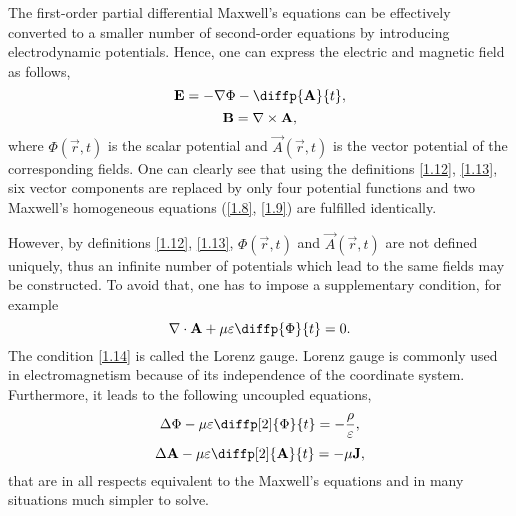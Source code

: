 The first-order partial differential Maxwell's equations can be effectively converted to a smaller number of second-order equations by introducing electrodynamic potentials. Hence, one can express the electric and magnetic field as follows,
\begin{equation}
\label{1.12}
\vec{E} = -\grad{\Phi} - \diffp{\vec{A}}{t},
\end{equation}
\begin{equation}
\label{1.13}
\mathbf{B} = \nabla \times \mathbf{A},
\end{equation}
where $ \Phi\left(\vec{r}, t \right) $ is the scalar potential and $ \vec{A}\left(\vec{r}, t \right) $ is the vector potential of the corresponding fields. One can clearly see that using the definitions \ref{1.12}, \ref{1.13}, six vector components are replaced by only four potential functions and two Maxwell's homogeneous equations (\ref{1.8}, \ref{1.9}) are fulfilled identically. 

However, by definitions \ref{1.12}, \ref{1.13}, $ \Phi\left(\vec{r}, t \right) $ and $ \vec{A}\left(\vec{r}, t \right) $ are not defined uniquely, thus an infinite number of potentials which lead to the same fields may be constructed. To avoid that, one has to impose a supplementary condition, for example
\begin{equation}
\label{1.14}
\div{\vec{A}} + \mu \varepsilon \diffp{\Phi}{t} = 0.
\end{equation}
The condition \ref{1.14} is called the Lorenz gauge. Lorenz gauge is commonly used in electromagnetism because of its independence of the coordinate system. Furthermore, it leads to the following uncoupled equations,
\begin{equation}
\label{1.15}
\laplace{\Phi} - \mu \varepsilon \diffp[2]{\Phi}{t} = -\frac{\rho}{\varepsilon},
\end{equation}
\begin{equation}
\label{1.16}
\laplace{\vec{A}} - \mu \varepsilon \diffp[2]{\vec{A}}{t} = -\mu \vec{J},
\end{equation}
that are in all respects equivalent to the Maxwell's equations and in many situations much simpler to solve.

